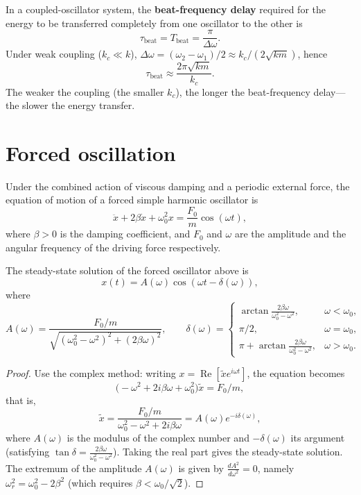 \begin{definition}\label{def:coupled_beat_delay}
In a coupled-oscillator system, the \textbf{beat-frequency delay} required for the energy to be transferred completely from one oscillator to the other is
\[
\tau_{\text{beat}} = T_{\text{beat}} = \frac{\pi}{\Delta\omega}.
\]
Under weak coupling ($k_c \ll k$), $\Delta\omega = (\omega_2-\omega_1)/2 \approx k_c/(2\sqrt{km})$, hence
\[
\tau_{\text{beat}} \approx \frac{2\pi\sqrt{km}}{k_c}.
\]
The weaker the coupling (the smaller $k_c$), the longer the beat-frequency delay---the slower the energy transfer.
\end{definition}

\section{Forced oscillation}

\begin{definition}\label{def:forced_oscillator}
Under the combined action of viscous damping and a periodic external force, the equation of motion of a forced simple harmonic oscillator is
\[
\ddot{x} + 2\beta\dot{x} + \omega_0^2 x = \frac{F_0}{m}\cos(\omega t),
\]
where $\beta > 0$ is the damping coefficient, and $F_0$ and $\omega$ are the amplitude and the angular frequency of the driving force respectively.
\end{definition}

\begin{theorem}\label{thm:resonance}
The steady-state solution of the forced oscillator above is
\[
x(t) = A(\omega)\cos(\omega t - \delta(\omega)),
\]
where
\[
A(\omega) = \frac{F_0/m}{\sqrt{(\omega_0^2 - \omega^2)^2 + (2\beta\omega)^2}}, \qquad \delta(\omega) = \begin{cases} \arctan\frac{2\beta\omega}{\omega_0^2 - \omega^2}, & \omega < \omega_0, \\ \pi/2, & \omega = \omega_0, \\ \pi + \arctan\frac{2\beta\omega}{\omega_0^2 - \omega^2}, & \omega > \omega_0. \end{cases}
\]
\end{theorem}

\begin{proof}
Use the complex method: writing $x = \operatorname{Re}[\tilde x e^{i\omega t}]$, the equation becomes
\[
\big(-\omega^2 + 2i\beta\omega + \omega_0^2\big)\tilde x = F_0/m,
\]
that is,
\[
\tilde x = \frac{F_0/m}{\omega_0^2 - \omega^2 + 2i\beta\omega} = A(\omega) e^{-i\delta(\omega)},
\]
where $A(\omega)$ is the modulus of the complex number and $-\delta(\omega)$ its argument (satisfying $\tan\delta = \frac{2\beta\omega}{\omega_0^2-\omega^2}$). Taking the real part gives the steady-state solution. The extremum of the amplitude $A(\omega)$ is given by $\frac{dA^2}{d\omega^2} = 0$, namely $\omega_r^2 = \omega_0^2 - 2\beta^2$ (which requires $\beta < \omega_0/\sqrt{2}$).
\end{proof}

